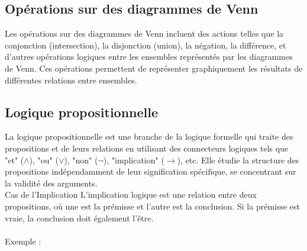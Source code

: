\documentclass{article}
\begin{document}
\subsection{\textbf{Opérations sur des diagrammes de Venn}}
Les opérations sur des diagrammes de Venn incluent des actions telles que la conjonction (intersection), la disjonction (union), la négation, la différence, et d'autres opérations logiques entre les ensembles représentés par les diagrammes de Venn. Ces opérations permettent de représenter graphiquement les résultats de différentes relations entre ensembles.


\subsection{\textbf{Logique propositionnelle}}
La logique propositionnelle est une branche de la logique formelle qui traite des propositions et de leurs relations en utilisant des connecteurs logiques tels que "et" ($\land$), "ou" ($\lor$), "non" ($\lnot$), "implication" ($\rightarrow$), etc. Elle étudie la structure des propositions indépendamment de leur signification spécifique, se concentrant sur la validité des arguments.
\\Cas de l'Implication
L'implication logique est une relation entre deux propositions, où une est la prémisse et l'autre est la conclusion. Si la prémisse est vraie, la conclusion doit également l'être.\\\\
Exemple : 
\end{document}
